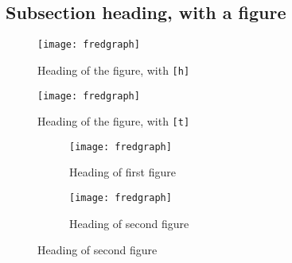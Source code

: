 \documentclass[12pt]{bppaper}
\begin{document}
\subsection{Subsection heading, with a figure}

\blindtext
\blindtext
\begin{figure}[h!]
\centering
\caption{Heading of the figure, with \texttt{[h]}}
\texttt{[image: fredgraph]}
\end{figure}
\blindtext

\blindtext

\blindtext
\begin{figure}[t]
\centering
\caption{Heading of the figure, with \texttt{[t]}}
\texttt{[image: fredgraph]}
\end{figure}
\blindtext


\blindtext
\begin{figure}[t]
\centering
\caption{Main heading of the figure, with \texttt{[t]}}
\begin{subfigure}{0.48\textwidth}
\caption{Heading of first figure}
\texttt{[image: fredgraph]}
\end{subfigure}
\begin{subfigure}{0.48\textwidth}
\caption{Heading of second figure}
\texttt{[image: fredgraph]}
\end{subfigure}
\end{figure}
\blindtext

\end{document}
